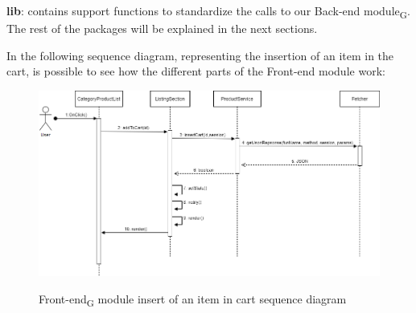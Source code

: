 \textbf{lib}: contains support functions to standardize the calls to our Back-end module\textsubscript{G}.\\
 The rest of the packages will be explained in the next sections.

\newpage
In the following sequence diagram, representing the insertion of an item in the cart, is possible to see how the different parts of the Front-end module work:
\begin{figure}[H]
\centering
\includegraphics[scale=0.70]{res/Architettura/Frontend/img/sequence_frontend_insertCart}\\
\caption{Front-end\textsubscript{G} module insert of an item in cart sequence diagram}
\end{figure}


